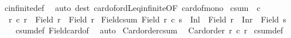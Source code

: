 \begin{isabellebody}
%
\isadelimproof
%
\endisadelimproof
%
\isatagproof
{}\isamarkupfalse%
\ cinfinite{\isacharunderscore}{\kern0pt}def\ \isamarkupfalse%
\ {\isacharparenleft}{\kern0pt}auto\ dest{\isacharcolon}{\kern0pt}\ card{\isacharunderscore}{\kern0pt}of{\isacharunderscore}{\kern0pt}ordLeq{\isacharunderscore}{\kern0pt}infinite{\isacharbrackleft}{\kern0pt}OF\ card{\isacharunderscore}{\kern0pt}of{\isacharunderscore}{\kern0pt}mono{}{\isacharbrackright}{\kern0pt}{\isacharparenright}{\kern0pt}%
\endisatagproof
{\isafoldproof}%
%
\isadelimproof
%
\endisadelimproof
%
\isadelimdocument
%
\endisadelimdocument
%
\isatagdocument
%
\isamarkuptrue%
%
\endisatagdocument
{\isafolddocument}%
%
\isadelimdocument
%
\endisadelimdocument
{}\isamarkupfalse%
\ csum\ {\isacharparenleft}{\kern0pt}\ {\isachardoublequoteopen}{\isacharplus}{\kern0pt}c{\isachardoublequoteclose}\ {}{}{\isacharparenright}{\kern0pt}\ \isanewline
\ \ {\isachardoublequoteopen}r{}\ {\isacharplus}{\kern0pt}c\ r{}\ {\isasymequiv}\ {\isacharbar}{\kern0pt}Field\ r{}\ {\isacharless}{\kern0pt}{\isacharplus}{\kern0pt}{\isachargreater}{\kern0pt}\ Field\ r{}{\isacharbar}{\kern0pt}{\isachardoublequoteclose}\isanewline
\isanewline
{}\isamarkupfalse%
\ Field{\isacharunderscore}{\kern0pt}csum{\isacharcolon}{\kern0pt}\ {\isachardoublequoteopen}Field\ {\isacharparenleft}{\kern0pt}r\ {\isacharplus}{\kern0pt}c\ s{\isacharparenright}{\kern0pt}\ {\isacharequal}{\kern0pt}\ Inl\ {\isacharbackquote}{\kern0pt}\ Field\ r\ {\isasymunion}\ Inr\ {\isacharbackquote}{\kern0pt}\ Field\ s{\isachardoublequoteclose}\isanewline
%
\isadelimproof
\ \ %
\endisadelimproof
%
\isatagproof
{}\isamarkupfalse%
\ csum{\isacharunderscore}{\kern0pt}def\ Field{\isacharunderscore}{\kern0pt}card{\isacharunderscore}{\kern0pt}of\ \isamarkupfalse%
\ auto%
\endisatagproof
{\isafoldproof}%
%
\isadelimproof
\isanewline
%
\endisadelimproof
\isanewline
{}\isamarkupfalse%
\ Card{\isacharunderscore}{\kern0pt}order{\isacharunderscore}{\kern0pt}csum{\isacharcolon}{\kern0pt}\isanewline
\ \ {\isachardoublequoteopen}Card{\isacharunderscore}{\kern0pt}order\ {\isacharparenleft}{\kern0pt}r{}\ {\isacharplus}{\kern0pt}c\ r{}{\isacharparenright}{\kern0pt}{\isachardoublequoteclose}\isanewline
%
\isadelimproof
%
\endisadelimproof
%
\isatagproof
{}\isamarkupfalse%
\ csum{\isacharunderscore}{\kern0pt}def\ \isamarkupfalse%

\end{isabellebody}
